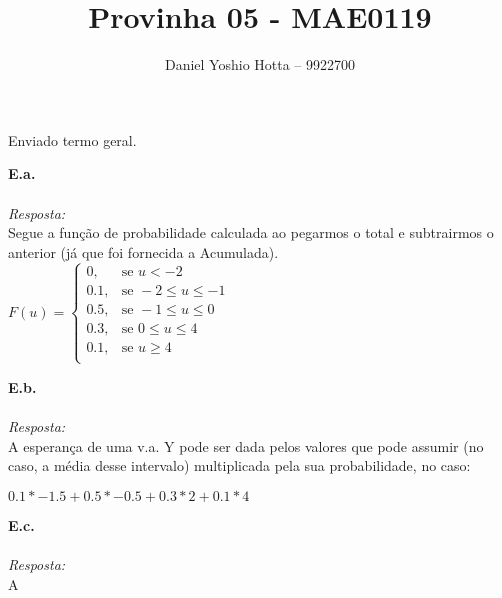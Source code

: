 \documentclass{article}
\begin{document}
	
	\title{Provinha 05 - MAE0119}
	\author{Daniel Yoshio Hotta – 9922700}
	
	\maketitle	
	
		Enviado termo geral.
	
	\textbf {E.a.} 
	\\ \\
	\textit {Resposta:} \\
    
    Segue a função de probabilidade calculada ao pegarmos o total e subtrairmos o anterior (já que foi fornecida a Acumulada).\\
    
    $	
    	F(u) = 
    	\begin{cases}
    		0  , & \mbox{se } u < -2\\
    		0.1, & \mbox{se } -2 \leq u \leq -1\\
    		0.5, & \mbox{se } -1 \leq u \leq 0\\
    		0.3, & \mbox{se } 0 \leq u \leq 4\\
    		0.1, & \mbox{se } u \geq 4\\
    	\end{cases}
    $

    
    \textbf {E.b.} 
    \\ \\
    \textit {Resposta:} \\
    
    A esperança de uma v.a. Y pode ser dada pelos valores que pode assumir (no caso, a média desse intervalo) multiplicada pela sua probabilidade, no caso:
    
    $ 0.1 * -1.5 + 0.5 * -0.5 + 0.3 * 2 + 0.1 * 4$
    
    \textbf {E.c.} 
    \\ \\
    \textit {Resposta:} \\
    
    A
	
\end{document}
